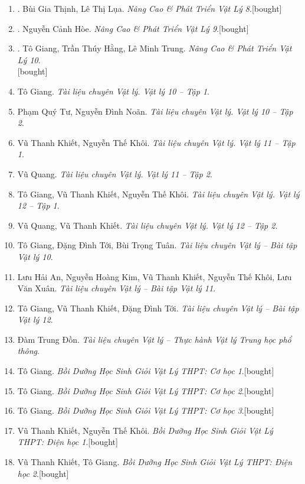 \documentclass{article}
\begin{document}
\begin{enumerate}
	\item \cite{Thinh_Lua2021}. Bùi Gia Thịnh, Lê Thị Lụa. \textit{Nâng Cao \& Phát Triển Vật Lý 8}.\hfill\textsf{[bought]}
	\item \cite{Hoe2021}. Nguyễn Cảnh Hòe. \textit{Nâng Cao \& Phát Triển Vật Lý 9}.\hfill\textsf{[bought]}
	\item \cite{Giang_Hang_Trung2022}. Tô Giang, Trần Thúy Hằng, Lê Minh Trung. \textit{Nâng Cao \& Phát Triển Vật Lý 10}.\\\mbox{}\hfill\textsf{[bought]}
	\item Tô Giang. \textit{Tài liệu chuyên Vật lý. Vật lý 10 -- Tập 1}.
	\item Phạm Quý Tư, Nguyễn Đình Noãn. \textit{Tài liệu chuyên Vật lý. Vật lý 10 -- Tập 2}.
	\item Vũ Thanh Khiết, Nguyễn Thế Khôi. \textit{Tài liệu chuyên Vật lý. Vật lý 11 -- Tập 1}.
	\item Vũ Quang. \textit{Tài liệu chuyên Vật lý. Vật lý 11 -- Tập 2}.
	\item Tô Giang, Vũ Thanh Khiết, Nguyễn Thế Khôi. \textit{Tài liệu chuyên Vật lý. Vật lý 12 -- Tập 1}.
	\item Vũ Quang, Vũ Thanh Khiết. \textit{Tài liệu chuyên Vật lý. Vật lý 12 -- Tập 2}.
	\item Tô Giang, Đặng Đình Tới, Bùi Trọng Tuân. \textit{Tài liệu chuyên Vật lý -- Bài tập Vật lý 10}.
	\item Lưu Hải An, Nguyễn Hoàng Kim, Vũ Thanh Khiết, Nguyễn Thế Khôi, Lưu Văn Xuân. \textit{Tài liệu chuyên Vật lý -- Bài tập Vật lý 11}.
	\item Tô Giang, Vũ Thanh Khiết, Đặng Đình Tới. \textit{Tài liệu chuyên Vật lý -- Bài tập Vật lý 12}.
	\item Đàm Trung Đồn. \textit{Tài liệu chuyên Vật lý -- Thực hành Vật lý Trung học phổ thông}.
	\item Tô Giang. \textit{Bồi Dưỡng Học Sinh Giỏi Vật Lý THPT: Cơ học 1}.\hfill\textsf{[bought]}
	\item Tô Giang. \textit{Bồi Dưỡng Học Sinh Giỏi Vật Lý THPT: Cơ học 2}.\hfill\textsf{[bought]}
	\item Tô Giang. \textit{Bồi Dưỡng Học Sinh Giỏi Vật Lý THPT: Cơ học 3}.\hfill\textsf{[bought]}
	\item Vũ Thanh Khiết, Nguyễn Thế Khôi. \textit{Bồi Dưỡng Học Sinh Giỏi Vật Lý THPT: Điện học 1}.\hfill\textsf{[bought]}
	\item Vũ Thanh Khiết, Tô Giang. \textit{Bồi Dưỡng Học Sinh Giỏi Vật Lý THPT: Điện học 2}.\hfill\textsf{[bought]}

\end{enumerate}
\end{document}
